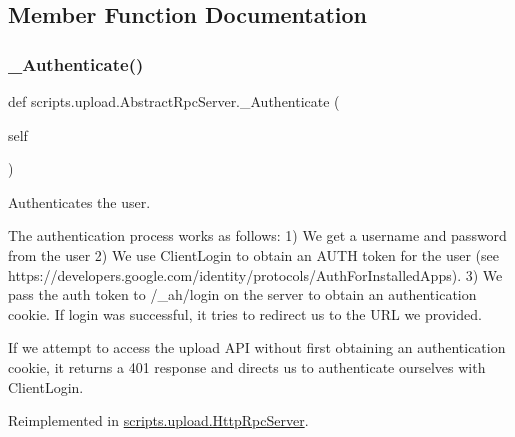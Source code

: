 \subsection{Member Function Documentation}
\mbox{\label{classscripts_1_1upload_1_1_abstract_rpc_server_a8b77ab8f04694ca25cb4f3a627e3fc18}} 
\subsubsection{\texorpdfstring{\_Authenticate()}{\_Authenticate()}}
{\footnotesize\ttfamily def scripts.\+upload.\+Abstract\+Rpc\+Server.\+\_\+\+Authenticate (\begin{DoxyParamCaption}\item[{}]{self }\end{DoxyParamCaption})\hspace{0.3cm}{\ttfamily [private]}}

\begin{DoxyVerb}Authenticates the user.

The authentication process works as follows:
 1) We get a username and password from the user
 2) We use ClientLogin to obtain an AUTH token for the user
(see https://developers.google.com/identity/protocols/AuthForInstalledApps).
 3) We pass the auth token to /_ah/login on the server to obtain an
authentication cookie. If login was successful, it tries to redirect
us to the URL we provided.

If we attempt to access the upload API without first obtaining an
authentication cookie, it returns a 401 response and directs us to
authenticate ourselves with ClientLogin.
\end{DoxyVerb}
 

Reimplemented in \mbox{\hyperlink{classscripts_1_1upload_1_1_http_rpc_server_a61268eda38c588475463218af8a050e0}{scripts.\+upload.\+Http\+Rpc\+Server}}.

\mbox{\label{classscripts_1_1upload_1_1_abstract_rpc_server_af3817748ffa7dc340ca55ba8f9787f16}} 
